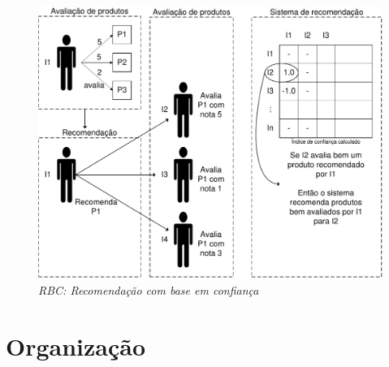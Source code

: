 \begin{figure}
  \centering
  \includegraphics[width=\textwidth]{imagens/RBC}
  \caption{\it RBC: Recomendação com base em confiança}
  \label{fig:RBC}
\end{figure}


\section{Organização} %



